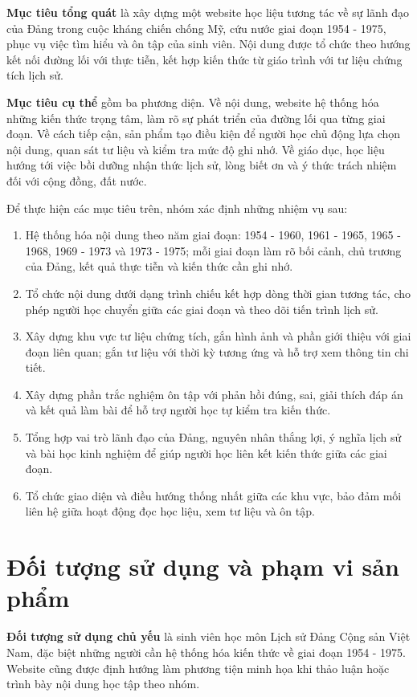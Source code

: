 \textbf{Mục tiêu tổng quát} là xây dựng một website học liệu tương tác về sự lãnh đạo của Đảng trong cuộc kháng chiến chống Mỹ, cứu nước giai đoạn 1954 - 1975, phục vụ việc tìm hiểu và ôn tập của sinh viên. Nội dung được tổ chức theo hướng kết nối đường lối với thực tiễn, kết hợp kiến thức từ giáo trình với tư liệu chứng tích lịch sử.

\textbf{Mục tiêu cụ thể} gồm ba phương diện. Về nội dung, website hệ thống hóa những kiến thức trọng tâm, làm rõ sự phát triển của đường lối qua từng giai đoạn. Về cách tiếp cận, sản phẩm tạo điều kiện để người học chủ động lựa chọn nội dung, quan sát tư liệu và kiểm tra mức độ ghi nhớ. Về giáo dục, học liệu hướng tới việc bồi dưỡng nhận thức lịch sử, lòng biết ơn và ý thức trách nhiệm đối với cộng đồng, đất nước.

Để thực hiện các mục tiêu trên, nhóm xác định những nhiệm vụ sau:

\begin{enumerate}
\item Hệ thống hóa nội dung theo năm giai đoạn: 1954 - 1960, 1961 - 1965, 1965 - 1968, 1969 - 1973 và 1973 - 1975; mỗi giai đoạn làm rõ bối cảnh, chủ trương của Đảng, kết quả thực tiễn và kiến thức cần ghi nhớ.
\item Tổ chức nội dung dưới dạng trình chiếu kết hợp dòng thời gian tương tác, cho phép người học chuyển giữa các giai đoạn và theo dõi tiến trình lịch sử.
\item Xây dựng khu vực tư liệu chứng tích, gắn hình ảnh và phần giới thiệu với giai đoạn liên quan; gắn tư liệu với thời kỳ tương ứng và hỗ trợ xem thông tin chi tiết.
\item Xây dựng phần trắc nghiệm ôn tập với phản hồi đúng, sai, giải thích đáp án và kết quả làm bài để hỗ trợ người học tự kiểm tra kiến thức.
\item Tổng hợp vai trò lãnh đạo của Đảng, nguyên nhân thắng lợi, ý nghĩa lịch sử và bài học kinh nghiệm để giúp người học liên kết kiến thức giữa các giai đoạn.
\item Tổ chức giao diện và điều hướng thống nhất giữa các khu vực, bảo đảm mối liên hệ giữa hoạt động đọc học liệu, xem tư liệu và ôn tập.
\end{enumerate}

\section{Đối tượng sử dụng và phạm vi sản phẩm}

\textbf{Đối tượng sử dụng chủ yếu} là sinh viên học môn Lịch sử Đảng Cộng sản Việt Nam, đặc biệt những người cần hệ thống hóa kiến thức về giai đoạn 1954 - 1975. Website cũng được định hướng làm phương tiện minh họa khi thảo luận hoặc trình bày nội dung học tập theo nhóm.

